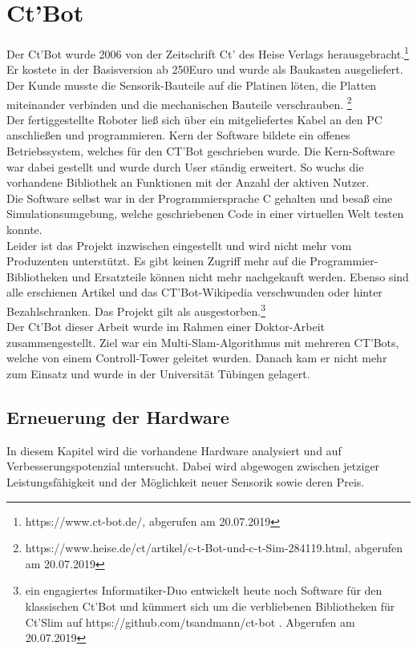 \documentclass[twoside,11pt, a4paper]{report}
\begin{document}
	\chapter{Ct'Bot}
	Der Ct'Bot wurde 2006 von der Zeitschrift Ct' des Heise Verlags herausgebracht.\footnote{https://www.ct-bot.de/, abgerufen am 20.07.2019} Er kostete in der Basisversion ab 250Euro und wurde als Baukasten ausgeliefert. Der Kunde musste die Sensorik-Bauteile auf die Platinen löten, die Platten miteinander verbinden und die mechanischen Bauteile verschrauben. \footnote{ https://www.heise.de/ct/artikel/c-t-Bot-und-c-t-Sim-284119.html, abgerufen am 20.07.2019} \\
	Der fertiggestellte Roboter ließ sich über ein mitgeliefertes Kabel an den PC anschließen und programmieren. Kern der Software bildete ein offenes Betriebssystem, welches für den CT'Bot geschrieben wurde. Die Kern-Software war dabei gestellt und wurde durch User ständig erweitert. So wuchs die vorhandene Bibliothek an Funktionen mit der Anzahl der aktiven Nutzer. \\
	Die Software selbst war in der Programmiersprache C gehalten und besaß eine Simulationsumgebung, welche geschriebenen Code in einer virtuellen Welt testen konnte. \\
	Leider ist das Projekt inzwischen eingestellt und wird nicht mehr vom Produzenten unterstützt. Es gibt keinen Zugriff mehr auf die Programmier-Bibliotheken und Ersatzteile können nicht mehr nachgekauft werden. Ebenso sind alle erschienen Artikel und das CT'Bot-Wikipedia verschwunden oder hinter Bezahlschranken. Das Projekt gilt als ausgestorben.\footnote{ein engagiertes Informatiker-Duo entwickelt heute noch Software für den klassischen Ct'Bot und kümmert sich um die verbliebenen Bibliotheken für Ct'Slim auf https://github.com/tsandmann/ct-bot . Abgerufen am 20.07.2019} \\
	Der Ct'Bot dieser Arbeit wurde im Rahmen einer Doktor-Arbeit zusammengestellt. Ziel war ein Multi-Slam-Algorithmus mit mehreren CT'Bots, welche von einem Controll-Tower geleitet wurden. Danach kam er nicht mehr zum Einsatz und wurde in der Universität Tübingen gelagert.  
	
	\section{Erneuerung der Hardware}
	In diesem Kapitel wird die vorhandene Hardware analysiert und auf Verbesserungspotenzial untersucht. Dabei wird abgewogen zwischen jetziger Leistungsfähigkeit und der Möglichkeit neuer Sensorik sowie deren Preis. 
	
\end{document}
